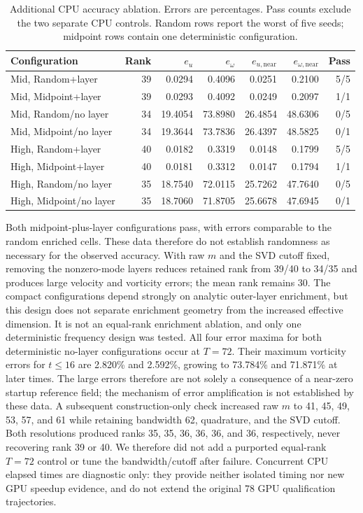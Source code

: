 \begin{table}[htbp]
\centering\small
\caption{Additional CPU accuracy ablation. Errors are percentages. Pass counts
exclude the two separate CPU controls. Random rows report the worst of five
seeds; midpoint rows contain one deterministic configuration.}
\label{tab:review-ablation}
\begin{tabular}{lrrrrrr}
\hline
Configuration & Rank & $e_u$ & $e_\omega$ & $e_{u,\mathrm{near}}$ & $e_{\omega,\mathrm{near}}$ & Pass \\
\hline
Mid, Random+layer & 39 & 0.0294 & 0.4096 & 0.0251 & 0.2100 & 5/5 \\
Mid, Midpoint+layer & 39 & 0.0293 & 0.4092 & 0.0249 & 0.2097 & 1/1 \\
Mid, Random/no layer & 34 & 19.4054 & 73.8980 & 26.4854 & 48.6306 & 0/5 \\
Mid, Midpoint/no layer & 34 & 19.3644 & 73.7836 & 26.4397 & 48.5825 & 0/1 \\
High, Random+layer & 40 & 0.0182 & 0.3319 & 0.0148 & 0.1799 & 5/5 \\
High, Midpoint+layer & 40 & 0.0181 & 0.3312 & 0.0147 & 0.1794 & 1/1 \\
High, Random/no layer & 35 & 18.7540 & 72.0115 & 25.7262 & 47.7640 & 0/5 \\
High, Midpoint/no layer & 35 & 18.7060 & 71.8705 & 25.6678 & 47.6945 & 0/1 \\
\hline
\end{tabular}
\end{table}

Both midpoint-plus-layer configurations pass, with errors comparable to the
random enriched cells. These data therefore do not establish randomness as
necessary for the observed accuracy. With raw $m$ and the SVD cutoff fixed,
removing the nonzero-mode layers reduces retained rank from 39/40 to 34/35 and
produces large velocity and vorticity errors; the mean rank remains 30.
The compact configurations depend strongly on analytic outer-layer enrichment,
but this design does not separate enrichment geometry from the increased
effective dimension. It is not an equal-rank enrichment ablation, and only one
deterministic frequency design was tested. All four error maxima for both
deterministic no-layer configurations occur at $T=72$. Their maximum vorticity
errors for $t\leq16$ are 2.820\% and 2.592\%, growing to 73.784\% and 71.871\%
at later times. The large errors therefore are not solely a consequence of a
near-zero startup reference field; the mechanism of error amplification is
not established by these data. A subsequent construction-only check increased raw $m$ to
41, 45, 49, 53, 57, and 61 while retaining bandwidth 62, quadrature, and the
SVD cutoff. Both resolutions produced ranks 35, 35, 36, 36, 36, and 36,
respectively, never recovering rank 39 or 40. We therefore did not add a
purported equal-rank $T=72$ control or tune the bandwidth/cutoff after failure.
Concurrent CPU elapsed times are
diagnostic only: they provide neither isolated timing nor new GPU speedup
evidence, and do not extend the original 78 GPU qualification trajectories.
